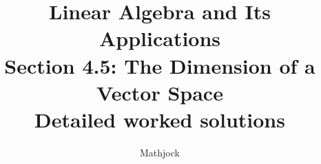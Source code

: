 
\title{\textbf{Linear Algebra and Its Applications}\\[0.3em]Section 4.5: The Dimension of a Vector Space\\[0.3em]\large Detailed worked solutions}
\author{Mathjock}
\date{}

\maketitle
\bookinfo
\tableofcontents
\clearpage
\renewcommand{\thesection}{4.\arabic{section}}
\renewcommand{\theHsection}{4.\arabic{section}}
\setcounter{section}{4}


